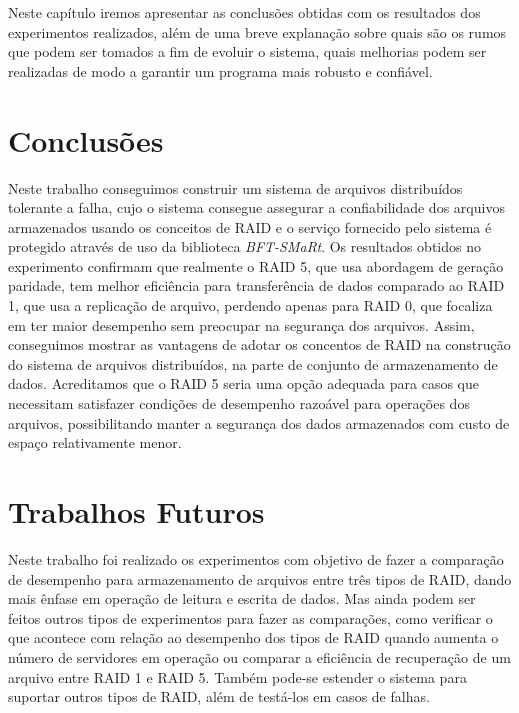Neste capítulo iremos apresentar as conclusões obtidas com os resultados dos experimentos realizados, além de uma breve explanação sobre quais são os rumos que podem ser tomados a fim de evoluir o sistema, quais melhorias podem ser realizadas de modo a garantir um programa mais robusto e confiável.
\\

\section{Conclusões}


Neste trabalho conseguimos construir um sistema de arquivos distribuídos tolerante a falha, cujo o sistema consegue assegurar a confiabilidade dos arquivos armazenados usando os conceitos de RAID e o serviço fornecido pelo sistema é protegido através de uso da biblioteca \textit{BFT-SMaRt}.
Os resultados obtidos no experimento confirmam que realmente o RAID 5, que usa abordagem de geração paridade, tem melhor eficiência para transferência de dados comparado ao RAID 1, que usa a replicação de arquivo, perdendo apenas para RAID 0, que focaliza em ter maior desempenho sem preocupar na segurança dos arquivos.
Assim, conseguimos mostrar as vantagens de adotar os concentos de RAID na construção do sistema de arquivos distribuídos, na parte de conjunto de armazenamento de dados. Acreditamos que o RAID 5 seria uma opção adequada para casos que necessitam satisfazer condições de desempenho razoável para operações dos arquivos, possibilitando manter a segurança dos dados armazenados com custo de espaço relativamente menor.
\\


\section{Trabalhos Futuros}

Neste trabalho foi realizado os experimentos com objetivo de fazer a comparação de desempenho para armazenamento de arquivos entre três tipos de RAID, dando mais ênfase em operação de leitura e escrita de dados.
Mas ainda podem ser feitos outros tipos de experimentos para fazer as comparações, como verificar o que acontece com relação ao desempenho dos tipos de RAID quando aumenta o número de servidores em operação ou comparar a eficiência de recuperação de um arquivo entre RAID 1 e RAID 5. Também pode-se estender o sistema para suportar outros tipos de RAID, além de testá-los em casos de falhas.
\\

